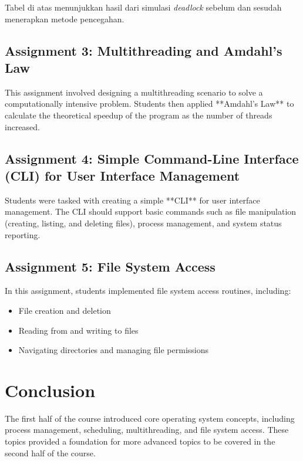 \documentclass[12pt]{article}
\begin{document}
Tabel di atas menunjukkan hasil dari simulasi \textit{deadlock} sebelum dan sesudah menerapkan metode pencegahan.

\subsection{Assignment 3: Multithreading and Amdahl's Law}
This assignment involved designing a multithreading scenario to solve a computationally intensive problem. Students then applied **Amdahl's Law** to calculate the theoretical speedup of the program as the number of threads increased.

\subsection{Assignment 4: Simple Command-Line Interface (CLI) for User Interface Management}
Students were tasked with creating a simple **CLI** for user interface management. The CLI should support basic commands such as file manipulation (creating, listing, and deleting files), process management, and system status reporting.

\subsection{Assignment 5: File System Access}
In this assignment, students implemented file system access routines, including:
\begin{itemize}
    \item File creation and deletion
    \item Reading from and writing to files
    \item Navigating directories and managing file permissions
\end{itemize}

\section{Conclusion}
The first half of the course introduced core operating system concepts, including process management, scheduling, multithreading, and file system access. These topics provided a foundation for more advanced topics to be covered in the second half of the course.
\end{document}
